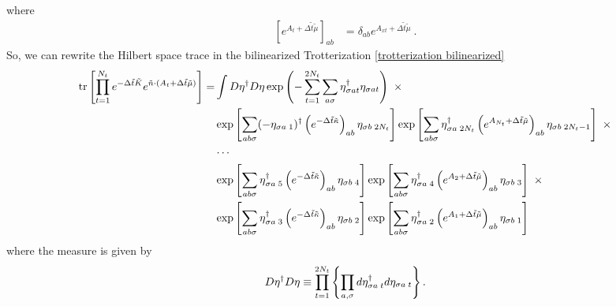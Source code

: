 where
\begin{align}
	\left[e^{A_t+ \Delta \tilde{t} \tilde{\mu}}\right]_{ab} &= \delta_{ab} e^{A_{xt} + \Delta \tilde{t} \tilde{\mu}}~.
\end{align}
So, we can rewrite the Hilbert space trace in the bilinearized Trotterization \eqref{trotterization bilinearized}
\begin{align}
	\text{tr}\left[\prod_{t=1}^{N_t} e^{-\Delta \tilde{t}\tilde{K}}  e^{ \tilde{n}\cdot (A_t + \Delta\tilde{t} \tilde{\mu})} \right]
	=& \int D\eta{}^{\dagger} D\eta \exp\left( - \sum_{t=1}^{2N_t}\sum_{a\sigma} \eta{}^{\dagger}_{\sigma a t} \eta_{\sigma a t}\right)~ \times
	\nonumber\\
	&
		\exp\left[ \sum_{ab\sigma} (-\eta_{\sigma a\;1}){}^{\dagger} \left(e^{-\Delta \tilde{t} \tilde{\kappa}}\right)_{ab} \eta_{\sigma b\;2N_t} \right]
		\exp\left[ \sum_{ab\sigma} \eta{}^{\dagger}_{\sigma a\;2N_t} \left(e^{A_{N_t}+\Delta\tilde{t}\tilde{\mu}}\right)_{ab} \eta_{\sigma b\;2N_t-1}\right] ~ \times
	\nonumber\\
	&
		\cdots
	\nonumber\\
	&
		\exp\left[ \sum_{ab\sigma} \eta{}^{\dagger}_{\sigma a\;5} \left(e^{-\Delta \tilde{t} \tilde{\kappa}}\right)_{ab} \eta_{\sigma b\;4} \right]
		\exp\left[ \sum_{ab\sigma} \eta{}^{\dagger}_{\sigma a\;4} \left(e^{A_{2}+\Delta\tilde{t}\tilde{\mu}}\right)_{ab} \eta_{\sigma b\;3}\right] ~ \times
	\nonumber\\
	&
		\exp\left[ \sum_{ab\sigma} \eta{}^{\dagger}_{\sigma a\;3} \left(e^{-\Delta \tilde{t} \tilde{\kappa}}\right)_{ab} \eta_{\sigma b\;2} \right]
		\exp\left[ \sum_{ab\sigma} \eta{}^{\dagger}_{\sigma a\;2} \left(e^{A_{1}+\Delta\tilde{t}\tilde{\mu}}\right)_{ab} \eta_{\sigma b\;1}\right]
\end{align}
where the measure is given by
\begin{equation}
	D\eta{}^{\dagger} D\eta \equiv \prod_{t=1}^{2N_t} \left\{ \prod_{a, \sigma} d \eta^{\dagger}_{\sigma a\; t} d\eta_{\sigma a\; t} \right\}.
\end{equation}

